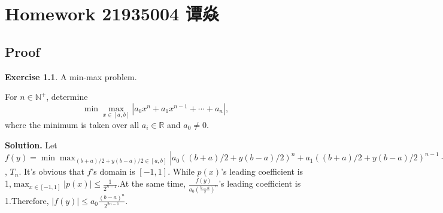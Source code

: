 \documentclass[a4paper]{book}
\makeatletter
\newenvironment{solution}%
{\noindent\textbf{Solution.}}%
{\qedhere}
\newcommand{\voidenvironment}[1]{%
  \expandafter\providecommand\csname env@#1@save@env\endcsname{}%
  \expandafter\providecommand\csname env@#1@process\endcsname{}%
  \@ifundefined{#1}{}{\RenewEnviron{#1}{}}%
}
\numberwithin{equation}{chapter}
\theoremstyle{definition}
\newtheorem{exc}[exm]{Exercise}
\makeatother
\begin{document}
\pagestyle{empty}
% 



\setcounter{chapter}{0}




\chapter{Homework 21935004 谭焱}



\section{Proof}\label{sec:p}

\begin{exc}
  A min-max problem.

  For $n \in \mathbb{N}^+$, determine
  \begin{equation}
    \label{eq:3:1:1}
    \min \max_{x \in [a,b]} | a_0 x^n + a_1 x^{n-1} + \cdots + a_n|,
  \end{equation}
  where the minimum is taken over all $a_i \in \mathbb{R} $ and $a_0 \neq 0$.
\end{exc}

\begin{solution}
  Let $ f(y) = \min \max_{(b+a)/2 + y(b - a)/2 \in [a,b]}|a_0((b+a)/2 + y(b - a)/2)^n + a_1 ((b+a)/2 + y(b-a)/2)^{n-1}+ \cdots +a_n|$, $T_n$. It's obvious that $f$'s domain is $[-1,1]$.
  While $p(x)$'s leading coefficient is 1,$\max_{x \in [-1,1]}|p(x)| \leq \frac{1}{2^{n-1}}$.At the same time, $\frac{f(y)}{a_0(\frac{b-a}{2})^n}$'s leading coefficient is 1.Therefore, $|f(y)| \leq a_0\frac{(b-a)^n}{2^{2n-1}} $. 
\end{solution}
\end{document}
